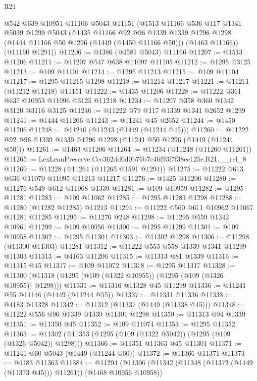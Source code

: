 \begin{lexlean}{R21}
\begin{coremodule}
    @542
    @639
    @10951
    @11106
    @5043
    @11151
    (@1513
      @11166
      @536
      @117
      @1341
      @5039
      @1299
      @5043
      (@1435
        @11166
        @92
        @96
        @1339
        @1339
        @1296
        @1298
        (@1444 @11166 @50 @1296 (@1449 (@1450 @11166 @50)))
        (@1463 @11166))
      (@11160 @1291))
@11206 := @1386 (@4581 @5043) @11166
@11207 := @1513 @11206
@11211 := @11207 @547 @638 @11097 @11105
@11212 := @1295 @3125
@11213 := @109 @11101
@11214 := @1295 @11213
@11215 := @109 @11104
@11217 := @1295 @11215 @1298
@11218 := @11214 @11217
@11221 := @11211 (@11212 @11218) @11151
@11222 := @1435 @11206
@11228 := @11222 @361 @637 @10953 @11096 @3125 @11218
@11234 := @11207 @358 @360 @1342 @3120 @3116 @3125
@11240 := @11222 @79 @117 @1339 @1341 @2652 @1299
@11241 := @1444 @11206
@11243 := @11241 @45 @2652
@11244 := @1450 @11206
@11248 := @11240 (@11243 (@1449 (@11244 @45)))
@11260 := @11222 @92 @96 @1339 @1339 @1296 @1298 (@11241 @50 @1296 (@1449 (@11244 @50)))
@11261 := @1463 @11206
@11264 := @11234 (@11248 (@11260 @11261))
@11265 := LexLeanPreserve.Ccc362dd0d0b76b7c46f93f7f38ec125e.R21.__rel_8
@11269 := @11228 (@11264 (@11265 @1591 @1291))
@11275 := @11222 @613 @636 @11070 @11095 @11213 @11217
@11276 := @1425 @11206
@11280 := @11276 @549 @612 @11068 @1339
@11281 := @109 @10959
@11282 := @1295 @11281
@11283 := @109 @11062
@11285 := @1295 @11283 @1298
@11288 := @11280 (@11282 @11285) @11213
@11294 := @11222 @560 @611 @10962 @11067 @11281 @11285
@11295 := @11276 @248
@11298 := @11295 @559 @1342 @10961
@11299 := @109 @10956
@11300 := @1295 @11299
@11301 := @109 @10958
@11302 := @1295 @11301
@11303 := @11302 @1298
@11306 := @11298 (@11300 @11303) @11281
@11312 := @11222 @553 @558 @1339 @1341 @11299 @11303
@11313 := @4163 @11206
@11315 := @11313 @81 @1339
@11316 := @11315 @45
@11317 := @109 @11072
@11318 := @1295 @11317
@11328 := @11300 (@11318 (@1295 (@109 (@1322 @10955)) (@1295 (@109 (@1326 @10955)) @1298)))
@11331 := @11316 @11328 @45 @11299
@11336 := @11241 @55 @11146 (@1449 (@11244 @55))
@11337 := @11331 @11336
@11338 := @4183 @11328
@11342 := @11312 (@11337 (@1449 (@11338 @45)))
@11348 := @11222 @556 @96 @1339 @1339 @11301 @1298
@11350 := @11313 @94 @1339
@11351 := @11350 @45
@11352 := @109 @11074
@11353 := @1295 @11352
@11363 := @11302 (@11353 (@1295 (@109 (@1322 @5042)) (@1295 (@109 (@1326 @5042)) @1298)))
@11366 := @11351 @11363 @45 @11301
@11371 := @11241 @60 @5043 (@1449 (@11244 @60))
@11372 := @11366 @11371
@11373 := @4183 @11363
@11384 := @11294
    (@11306 (@11342 (@11348 (@11372 (@1449 (@11373 @45))) @11261)) (@1468 @10956 @10958))

\end{coremodule}
\end{lexlean}
